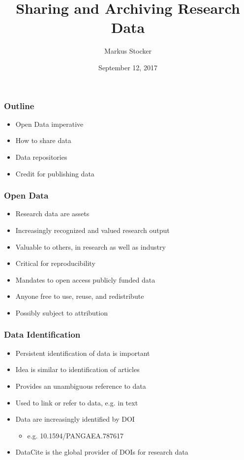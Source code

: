 \documentclass{beamer}
\title{Sharing and Archiving Research Data}
\author{Markus Stocker}
\date{September 12, 2017}
\begin{document}
\maketitle

\begin{frame}
  \frametitle{Outline}
  
  \begin{itemize}
  \item Open Data imperative
  \item How to share data
  \item Data repositories
  \item Credit for publishing data
  \end{itemize}
\end{frame}

\begin{frame}
  \frametitle{Open Data}
  
  \begin{itemize}
  \item Research data are assets
  \item Increasingly recognized and valued research output	
  \item Valuable to others, in research as well as industry
  \item Critical for reproducibility
  \item Mandates to open access publicly funded data
  \item Anyone free to use, reuse, and redistribute
  \item Possibly subject to attribution
  \end{itemize}
\end{frame}

\begin{frame}
  \frametitle{Data Identification}
  
  \begin{itemize}
  \item Persistent identification of data is important
  \item Idea is similar to identification of articles
  \item Provides an unambiguous reference to data
  \item Used to link or refer to data, e.g. in text
  \item Data are increasingly identified by DOI 
  \begin{itemize}
  \item e.g. 10.1594/PANGAEA.787617
  \end{itemize}
  \item DataCite is the global provider of DOIs for research data
  \end{itemize}
\end{frame}
\end{document}
